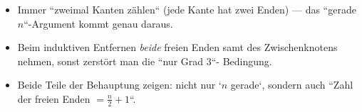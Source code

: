 \begin{achtung}
\begin{itemize}
  \item Immer ``zweimal Kanten zählen`` (jede Kante hat zwei Enden) ---
        das ``gerade $n$``-Argument kommt genau daraus.
  \item Beim induktiven Entfernen \emph{beide} freien Enden samt des
        Zwischenknotens nehmen, sonst zerstört man die ``nur Grad 3``-
        Bedingung.
  \item Beide Teile der Behauptung zeigen: nicht nur `$n$ gerade`, sondern
        auch ``Zahl der freien Enden $=\tfrac n2+1$``.
\end{itemize}
\end{achtung}
